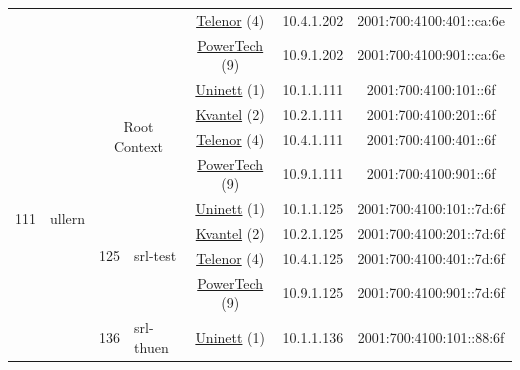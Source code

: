\begin{small}
\begin{center}
\begin{longtable}{|c|c|c|c|c|c|c|c|}
  &  &  &  & \multicolumn{2}{|c|}{\tiny{\href{https://www.telenor.no}{Telenor} (4)}} & \tiny{10.4.1.202} & \tiny{2001:700:4100:401::ca:6e} \\* \cline{5-5}\cline{6-6}\cline{7-7}\cline{8-8}
  &  &  &  & \multicolumn{2}{|c|}{\tiny{\href{http://www.powertech.no}{PowerTech} (9)}} & \tiny{10.9.1.202} & \tiny{2001:700:4100:901::ca:6e} \\ \hline
 \multirow{40}{*}{\tiny{111}} & \multicolumn{1}{|l|}{\multirow{40}{*}{\tiny{ullern}}} & \multicolumn{2}{|c|}{\multirow{4}{*}{\tiny{Root Context}}} & \multicolumn{2}{|c|}{\tiny{\href{https://www.uninett.no}{Uninett} (1)}} & \tiny{10.1.1.111} & \tiny{2001:700:4100:101::6f} \\* \cline{5-5}\cline{6-6}\cline{7-7}\cline{8-8}
  &  & \multicolumn{2}{|c|}{} & \multicolumn{2}{|c|}{\tiny{\href{http://kvantel.no}{Kvantel} (2)}} & \tiny{10.2.1.111} & \tiny{2001:700:4100:201::6f} \\* \cline{5-5}\cline{6-6}\cline{7-7}\cline{8-8}
  &  & \multicolumn{2}{|c|}{} & \multicolumn{2}{|c|}{\tiny{\href{https://www.telenor.no}{Telenor} (4)}} & \tiny{10.4.1.111} & \tiny{2001:700:4100:401::6f} \\* \cline{5-5}\cline{6-6}\cline{7-7}\cline{8-8}
  &  & \multicolumn{2}{|c|}{} & \multicolumn{2}{|c|}{\tiny{\href{http://www.powertech.no}{PowerTech} (9)}} & \tiny{10.9.1.111} & \tiny{2001:700:4100:901::6f} \\* \cline{3-3}\cline{4-4}\cline{5-5}\cline{6-6}\cline{7-7}\cline{8-8}
  &  & \multirow{4}{*}{\tiny{125}} & \multicolumn{1}{|l|}{\multirow{4}{*}{\tiny{srl-test}}} & \multicolumn{2}{|c|}{\tiny{\href{https://www.uninett.no}{Uninett} (1)}} & \tiny{10.1.1.125} & \tiny{2001:700:4100:101::7d:6f} \\* \cline{5-5}\cline{6-6}\cline{7-7}\cline{8-8}
  &  &  &  & \multicolumn{2}{|c|}{\tiny{\href{http://kvantel.no}{Kvantel} (2)}} & \tiny{10.2.1.125} & \tiny{2001:700:4100:201::7d:6f} \\* \cline{5-5}\cline{6-6}\cline{7-7}\cline{8-8}
  &  &  &  & \multicolumn{2}{|c|}{\tiny{\href{https://www.telenor.no}{Telenor} (4)}} & \tiny{10.4.1.125} & \tiny{2001:700:4100:401::7d:6f} \\* \cline{5-5}\cline{6-6}\cline{7-7}\cline{8-8}
  &  &  &  & \multicolumn{2}{|c|}{\tiny{\href{http://www.powertech.no}{PowerTech} (9)}} & \tiny{10.9.1.125} & \tiny{2001:700:4100:901::7d:6f} \\* \cline{3-3}\cline{4-4}\cline{5-5}\cline{6-6}\cline{7-7}\cline{8-8}
  &  & \multirow{4}{*}{\tiny{136}} & \multicolumn{1}{|l|}{\multirow{4}{*}{\tiny{srl-thuen}}} & \multicolumn{2}{|c|}{\tiny{\href{https://www.uninett.no}{Uninett} (1)}} & \tiny{10.1.1.136} & \tiny{2001:700:4100:101::88:6f} \\* \cline{5-5}\cline{6-6}\cline{7-7}\cline{8-8}

\end{longtable}
\end{center}
\end{small}
